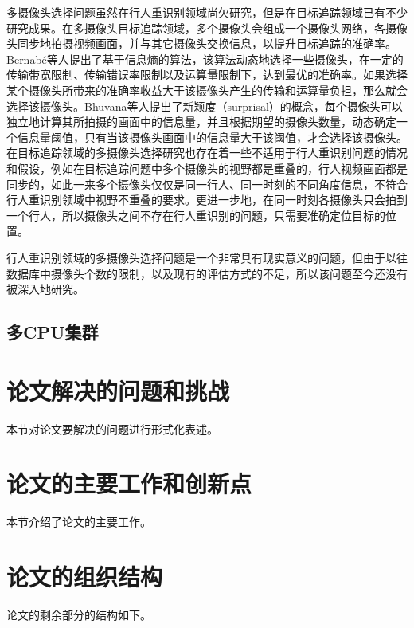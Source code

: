 多摄像头选择问题虽然在行人重识别领域尚欠研究，但是在目标追踪领域已有不少研究成果。在多摄像头目标追踪领域，多个摄像头会组成一个摄像头网络，各摄像头同步地拍摄视频画面，并与其它摄像头交换信息，以提升目标追踪的准确率。Bernab{\'e}等人\cite{de2012entropy}提出了基于信息熵的算法，该算法动态地选择一些摄像头，在一定的传输带宽限制、传输错误率限制以及运算量限制下，达到最优的准确率。如果选择某个摄像头所带来的准确率收益大于该摄像头产生的传输和运算量负担，那么就会选择该摄像头。Bhuvana等人\cite{bhuvana2016multi}提出了新颖度（surprisal）的概念，每个摄像头可以独立地计算其所拍摄的画面中的信息量，并且根据期望的摄像头数量，动态确定一个信息量阈值，只有当该摄像头画面中的信息量大于该阈值，才会选择该摄像头。在目标追踪领域的多摄像头选择研究也存在着一些不适用于行人重识别问题的情况和假设，例如在目标追踪问题中多个摄像头的视野都是重叠的，行人视频画面都是同步的，如此一来多个摄像头仅仅是同一行人、同一时刻的不同角度信息，不符合行人重识别领域中视野不重叠的要求。更进一步地，在同一时刻各摄像头只会拍到一个行人，所以摄像头之间不存在行人重识别的问题，只需要准确定位目标的位置。

行人重识别领域的多摄像头选择问题是一个非常具有现实意义的问题，但由于以往数据库中摄像头个数的限制，以及现有的评估方式的不足，所以该问题至今还没有被深入地研究。

\subsection{多CPU集群}

\section{论文解决的问题和挑战}
本节对论文要解决的问题进行形式化表述。

\section{论文的主要工作和创新点}
本节介绍了论文的主要工作。

\section{论文的组织结构}
论文的剩余部分的结构如下。